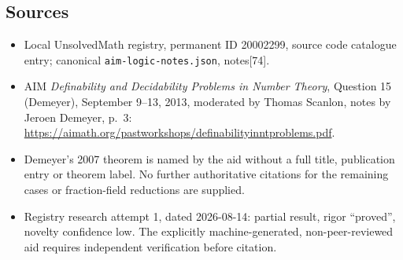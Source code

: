 \documentclass[11pt]{article}
\begin{document}
\subsection{Sources}
\begin{itemize}
\item Local UnsolvedMath registry, permanent ID 20002299, source code catalogue entry; canonical \texttt{aim-logic-notes.json}, notes[74].
\item AIM \emph{Definability and Decidability Problems in Number Theory}, Question 15 (Demeyer), September 9--13, 2013, moderated by Thomas Scanlon, notes by Jeroen Demeyer, p.~3: \url{https://aimath.org/pastworkshops/definabilityinntproblems.pdf}.
\item Demeyer's 2007 theorem is named by the aid without a full title, publication entry or theorem label. No further authoritative citations for the remaining cases or fraction-field reductions are supplied.
\item Registry research attempt 1, dated 2026-08-14: partial result, rigor ``proved'', novelty confidence low. The explicitly machine-generated, non-peer-reviewed aid requires independent verification before citation.
\end{itemize}
\end{document}
